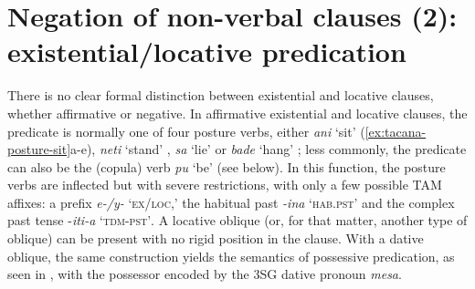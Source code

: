 \documentclass[output=paper]{langsci/langscibook}
\begin{document}
\section{Negation of non-verbal clauses (2): existential\slash locative predication}\label{sec:tacana-5}

There is no clear formal distinction between existential and locative
clauses, whether affirmative or negative. In affirmative existential and
locative clauses, the predicate is normally one of four posture verbs,
either \textit{ani} `sit' (\ref{ex:tacana-posture-sit}a-e), \textit{neti}
`stand' , \textit{sa} `lie'
 or \textit{bade} `hang'
; less commonly, the predicate can also be the
(copula) verb \textit{pu} `be' (see below). In this function, the posture
verbs are inflected but with severe restrictions, with only a few possible
TAM affixes: a prefix \textit{e-/y-} `\textsc{ex\slash loc},' the habitual
past \textit{-ina} `\textsc{hab.pst}' and the complex past tense
-\textit{iti-a}  `\textsc{tdm-pst'}. A locative oblique (or, for that
matter, another type of oblique) can be present with no rigid position in
the clause. With a dative oblique, the same construction yields the
semantics of possessive predication, as seen in
, with the possessor encoded by the 3SG dative pronoun \textit{mesa}.
\end{document}
